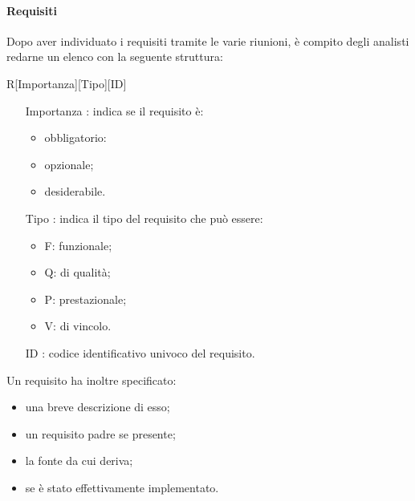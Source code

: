 		\paragraph{Requisiti}%
		Dopo aver individuato i requisiti tramite le varie riunioni, è compito degli analisti redarne un elenco con la seguente struttura:
		
		\centerline{R[Importanza][Tipo][ID]}
		\begin{itemize}
		
			\item[Importanza]: indica se il requisito è:
			
			\begin{itemize}
				\item obbligatorio:
				\item opzionale;
				\item desiderabile.
			\end{itemize}
			
			\item[Tipo]: indica il tipo del requisito che può essere:
			
			\begin{itemize}
				\item F: funzionale;
				\item Q: di qualità;
				\item P: prestazionale;
				\item V: di vincolo.
			\end{itemize}
			
			\item [ID]: codice identificativo univoco del requisito.
			
		\end{itemize}
		
		Un requisito ha inoltre specificato:
		\begin{itemize}
		\item una breve descrizione di esso;
		\item un requisito padre se presente;
		\item la fonte da cui deriva;
		\item se è stato effettivamente implementato.
		\end{itemize}
